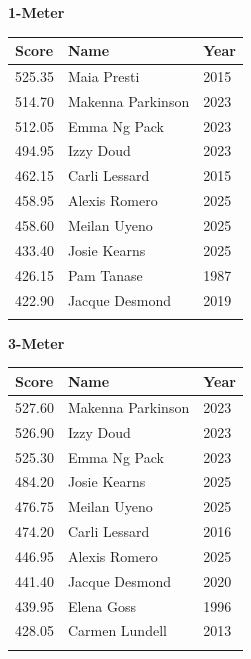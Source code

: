 \vspace{1.2em}
\noindent\begin{minipage}[t]{0.48\textwidth}
\centering
\textbf{\textcolor{teamprimary}{1-Meter}}\par
\vspace{0.5em}
\centering
\small
\renewcommand{\arraystretch}{1.0}
\setlength{\tabcolsep}{4pt}
\begin{tabular}{@{}p{1.8cm}p{3.0cm}p{1.0cm}@{}}
\toprule
\textbf{Score} & \textbf{Name} & \textbf{Year} \\
\midrule
525.35 & Maia Presti & 2015 \\
514.70 & Makenna Parkinson & 2023 \\
512.05 & Emma Ng Pack & 2023 \\
494.95 & Izzy Doud & 2023 \\
462.15 & Carli Lessard & 2015 \\
458.95 & Alexis Romero & 2025 \\
458.60 & Meilan Uyeno & 2025 \\
433.40 & Josie Kearns & 2025 \\
426.15 & Pam Tanase & 1987 \\
422.90 & Jacque Desmond & 2019 \\
\bottomrule
\vspace{0.5em}
\end{tabular}
\end{minipage}
\hfill
\begin{minipage}[t]{0.48\textwidth}
\centering
\textbf{\textcolor{teamprimary}{3-Meter}}\par
\vspace{0.5em}
\centering
\small
\renewcommand{\arraystretch}{1.0}
\setlength{\tabcolsep}{4pt}
\begin{tabular}{@{}p{1.8cm}p{3.0cm}p{1.0cm}@{}}
\toprule
\textbf{Score} & \textbf{Name} & \textbf{Year} \\
\midrule
527.60 & Makenna Parkinson & 2023 \\
526.90 & Izzy Doud & 2023 \\
525.30 & Emma Ng Pack & 2023 \\
484.20 & Josie Kearns & 2025 \\
476.75 & Meilan Uyeno & 2025 \\
474.20 & Carli Lessard & 2016 \\
446.95 & Alexis Romero & 2025 \\
441.40 & Jacque Desmond & 2020 \\
439.95 & Elena Goss & 1996 \\
428.05 & Carmen Lundell & 2013 \\
\bottomrule
\vspace{0.5em}
\end{tabular}
\end{minipage}
